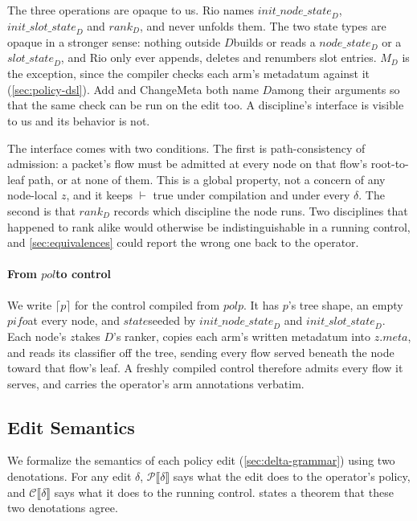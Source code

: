 \documentclass[sigplan,anonymous,review,nonacm]{acmart}
\newcommand{\csem}[1]{\mathcal{C}\llbracket #1 \rrbracket}
\newcommand{\psem}[1]{\mathcal{P}\llbracket #1 \rrbracket}
\newcommand{\notation}[1]{\ensuremath{#1}\ifmmode\else\xspace\fi}
\newcommand{\pol}{\notation{\mathit{pol}}}
\newcommand{\pifo}{\notation{\mathit{pifo}}}
\newcommand{\zz}{\notation{\mathit{z}}}
\newcommand{\stt}{\notation{\mathit{state}}}
\newcommand{\disc}{\notation{D}}
\newcommand{\Add}{\textsf{Add}}
\newcommand{\ChangeMeta}{\textsf{ChangeMeta}}
\begin{document}
The three operations are opaque to us.
Rio names \(\mathit{init\_node\_state}_{D}\), \(\mathit{init\_slot\_state}_{D}\) and \(\mathit{rank}_{D}\), and never unfolds them.
The two state types are opaque in a stronger sense: nothing outside \disc builds or reads a \(\mathit{node\_state}_{D}\) or a \(\mathit{slot\_state}_{D}\), and Rio only ever appends, deletes and renumbers slot entries.
\(M_{D}\) is the exception, since the compiler checks each arm's metadatum against it (\cref{sec:policy-dsl}).
\Add{} and \ChangeMeta{} both name \disc among their arguments so that the same check can be run on the edit too.
A discipline's interface is visible to us and its behavior is not.

The interface comes with two conditions.
The first is path-consistency of admission: a packet's flow must be admitted at every node on that flow's root-to-leaf path, or at none of them.
This is a global property, not a concern of any node-local \zz, and it keeps \(\vdash\) true under compilation and under every \(\delta\).
The second is that \(\mathit{rank}_{D}\) records which discipline the node runs.
Two disciplines that happened to rank alike would otherwise be indistinguishable in a running control, and \cref{sec:equivalences} could report the wrong one back to the operator.

\paragraph{From \pol to control}

We write \(\lceil p \rceil\) for the control compiled from \pol \(p\).
It has \(p\)'s tree shape, an empty \pifo at every node, and \stt seeded by \(\mathit{init\_node\_state}_{D}\) and \(\mathit{init\_slot\_state}_{D}\).
Each node's \zz takes \disc's ranker, copies each arm's written metadatum into \(\mathit{z}.\mathit{meta}\), and reads its classifier off the tree, sending every flow served beneath the node toward that flow's leaf.
A freshly compiled control therefore admits every flow it serves, and carries the operator's arm annotations verbatim.

\subsection{Edit Semantics}\label{sec:edit-semantics}

We formalize the semantics of each policy edit (\cref{sec:delta-grammar}) using two denotations.
For any edit $\delta$,
\(\psem{\delta}\) says what the edit does to the operator's policy, and \(\csem{\delta}\) says what it does to the running control.
 states a theorem that these two denotations agree.
\end{document}
